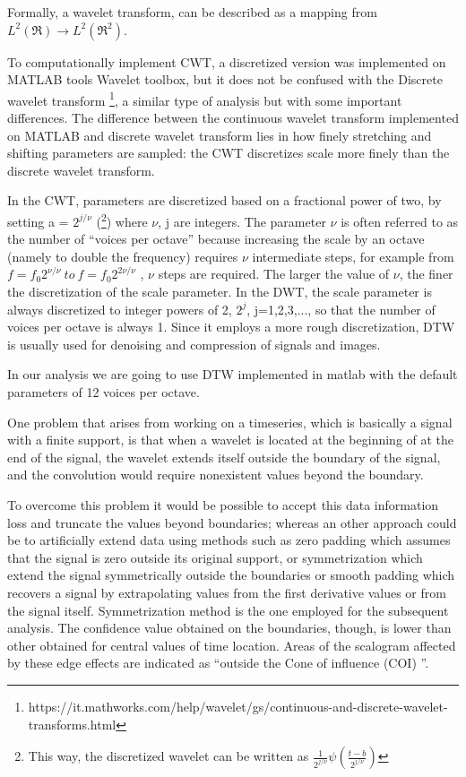 \documentclass[10pt]{report}
\begin{document}
Formally, a wavelet transform, can be described as a mapping from $L^2(\Re) \rightarrow L^2(\Re^2)$.

To computationally implement CWT, a discretized version was implemented on MATLAB tools Wavelet toolbox, but it does not be confused with the Discrete wavelet transform \footnote{https://it.mathworks.com/help/wavelet/gs/continuous-and-discrete-wavelet-transforms.html}, a similar type of analysis but with some important differences.
The difference between the continuous wavelet transform implemented on MATLAB and discrete wavelet transform lies in how finely stretching and shifting parameters are sampled: the CWT discretizes scale more finely than the discrete wavelet transform.

In the CWT, parameters are discretized based on a fractional power of two, by setting a = $2^{j/\nu}$  (\footnote{This way, the discretized wavelet can be written as $\frac{1}{2^{j/\nu}} \psi\left ( \frac{t-b}{2^{j/\nu}}\right )$ }) \cite{liu-1994} \cite{dabauchies-1992} where $\nu $, j are integers.
The parameter $\nu$ is often referred to as the number of “voices per octave” because increasing the scale by an octave (namely to double the frequency) requires $\nu$ intermediate steps, for example from $f = f_0 2^{\nu/\nu} \ to \ f = f_0 2^{2\nu/\nu}$ , $\nu$ steps are required.
The larger the value of $\nu$, the finer the discretization of the scale parameter.
In the DWT, the scale parameter is always discretized to integer powers of 2, $2^j$, j=1,2,3,..., so that the number of voices per octave is always 1.
Since it employs a more rough discretization, DTW is usually used for denoising and compression of signals and images.

In our analysis we are going to use DTW implemented in matlab with the default parameters of 12 voices per octave.


One problem that arises from working on a timeseries, which is basically a signal with a finite support, is that when a wavelet is located at the beginning of at the end of the signal, the wavelet extends itself outside the boundary of the signal, and the convolution would require nonexistent values beyond the boundary.

To overcome this problem it would be possible to accept this data information loss and truncate the values beyond boundaries; whereas an other approach could be to artificially extend data using methods such as zero padding which assumes that the signal is zero outside its original support, or symmetrization which extend the signal symmetrically outside the boundaries or smooth padding which recovers a signal by extrapolating values from the first derivative values or from the signal itself.
Symmetrization method is the one employed for the subsequent analysis.
The confidence value obtained on the boundaries, though, is lower than other obtained for central values of time location.
Areas of the scalogram affected by these edge effects are indicated as \textquotedblleft outside the Cone of influence (COI) \textquotedblright.
\end{document}
